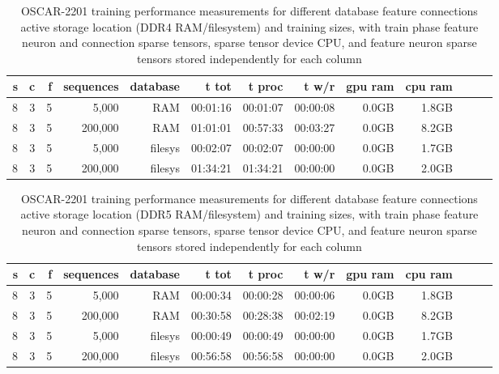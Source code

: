 \begin{table}[H]
\centering
\caption{OSCAR-2201 training performance measurements for different database feature connections active storage location (DDR4 RAM/filesystem) and training sizes, with train phase feature neuron and connection sparse tensors, sparse tensor device CPU, and feature neuron sparse tensors stored independently for each column}
\label{tab:oscar-performance-trainSparseConnectionsNeuronsTensor-storeDatabaseFeatureNeuronsInRamFalse-storeDatabaseFeatureConnectionsAndColumnFeatureNeurons-DDR4}
\begin{tabular}{rrrrrrrrrrrrr}
\toprule
\textbf{s} & \textbf{c} & \textbf{f} & \textbf{sequences} & \textbf{database} & \textbf{t tot} & \textbf{t proc} & \textbf{t w/r} & \textbf{gpu ram} & \textbf{cpu ram} \\
\midrule
8 & 3 & 5 & 5,000       & RAM & 00:01:16 & 00:01:07 & 00:00:08 & 0.0GB & 1.8GB \\
8 & 3 & 5 & 200,000     & RAM & 01:01:01 & 00:57:33 & 00:03:27 & 0.0GB & 8.2GB \\
8 & 3 & 5 & 5,000       & filesys & 00:02:07 & 00:02:07 & 00:00:00 & 0.0GB & 1.7GB \\
8 & 3 & 5 & 200,000     & filesys & 01:34:21 & 01:34:21 & 00:00:00 & 0.0GB & 2.0GB \\
\bottomrule
\end{tabular}
\end{table}

\begin{table}[H]
\centering
\caption{OSCAR-2201 training performance measurements for different database feature connections active storage location (DDR5 RAM/filesystem) and training sizes, with train phase feature neuron and connection sparse tensors, sparse tensor device CPU, and feature neuron sparse tensors stored independently for each column}
\label{tab:oscar-performance-trainSparseConnectionsNeuronsTensor-storeDatabaseFeatureNeuronsInRamFalse-storeDatabaseFeatureConnectionsAndColumnFeatureNeurons-DDR5}
\begin{tabular}{rrrrrrrrrrrrr}
\toprule
\textbf{s} & \textbf{c} & \textbf{f} & \textbf{sequences} & \textbf{database} & \textbf{t tot} & \textbf{t proc} & \textbf{t w/r} & \textbf{gpu ram} & \textbf{cpu ram} \\
\midrule
8 & 3 & 5 & 5,000       & RAM & 00:00:34 & 00:00:28 & 00:00:06 & 0.0GB & 1.8GB \\
8 & 3 & 5 & 200,000     & RAM & 00:30:58 & 00:28:38 & 00:02:19 & 0.0GB & 8.2GB \\
8 & 3 & 5 & 5,000       & filesys & 00:00:49 & 00:00:49 & 00:00:00 & 0.0GB & 1.7GB \\
8 & 3 & 5 & 200,000     & filesys & 00:56:58 & 00:56:58 & 00:00:00 & 0.0GB & 2.0GB \\
\bottomrule
\end{tabular}
\end{table}

